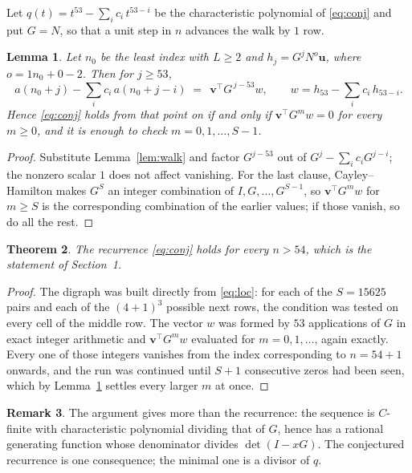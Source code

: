 \documentclass[11pt,a4paper]{article}
\theoremstyle{plain}
\newtheorem{theorem}{Theorem}
\newtheorem{lemma}[theorem]{Lemma}
\theoremstyle{definition}
\newtheorem{remark}[theorem]{Remark}
\begin{document}
Let $q(t)=t^{53}-\sum_i c_i\,t^{53-i}$ be the characteristic polynomial of
\eqref{eq:conj} and put $G=N$, so that a unit step in $n$ advances the walk by
$1$ row.

\begin{lemma}\label{lem:crit}
Let $n_0$ be the least index with $L\ge2$ and $h_j=G^{j}N^{o}\mathbf{u}$, where
$o=1n_0+0-2$. Then for $j\ge53$,
\[
a(n_0+j)-\sum_i c_i\,a(n_0+j-i)\;=\;\,\mathbf{v}^{\!\top}G^{\,j-53}w,
\qquad w=h_{53}-\sum_i c_i\,h_{53-i} .
\]
Hence \eqref{eq:conj} holds from that point on if and only if
$\mathbf{v}^{\!\top}G^{m}w=0$ for every $m\ge0$, and it is enough to check
$m=0,1,\dots,S-1$.
\end{lemma}

\begin{proof}
Substitute Lemma~\ref{lem:walk} and factor $G^{j-53}$ out of
$G^{j}-\sum_ic_iG^{j-i}$; the nonzero scalar $1$ does not affect
vanishing. For the last clause, Cayley--Hamilton makes $G^{S}$ an integer combination of
$I,G,\dots,G^{S-1}$, so $\mathbf{v}^{\!\top}G^{m}w$ for $m\ge S$ is the corresponding
combination of the earlier values; if those vanish, so do all the rest.
\end{proof}

\begin{theorem}
The recurrence \eqref{eq:conj} holds for every $n>54$, which is the statement of
Section~1.
\end{theorem}

\begin{proof}
The digraph was built directly from \eqref{eq:loc}: for each of the $S=15625$ pairs and each
of the $(4+1)^{3}$ possible next rows, the condition was tested on every cell of
the middle row. The vector $w$ was formed by $53$ applications of $G$ in exact integer
arithmetic and $\mathbf{v}^{\!\top}G^{m}w$ evaluated for $m=0,1,\dots$, again exactly.
Every one of those integers vanishes from the index corresponding to $n=54+1$ onwards,
and the run was continued until $S+1$ consecutive zeros had been seen, which by
Lemma~\ref{lem:crit} settles every larger $m$ at once.
\end{proof}

\begin{remark}
The argument gives more than the recurrence: the sequence is $C$-finite with characteristic
polynomial dividing that of $G$, hence has a rational generating function whose denominator
divides $\det(I-xG)$. The conjectured recurrence is one consequence; the minimal one is a
divisor of $q$.
\end{remark}
\end{document}
